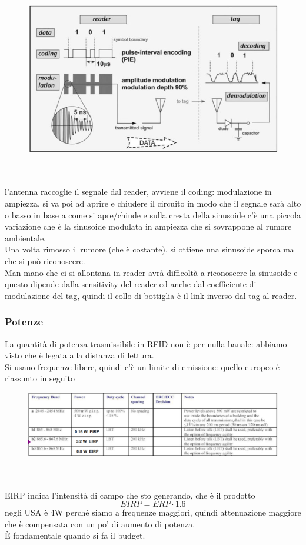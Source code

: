 \documentclass[oneside, 12pt]{extbook}
\begin{document}
\begin{figure}[!h]
	\includegraphics[scale=0.2]{immagini/read-to-tag-mod.png}
\end{figure}\\\\
l'antenna raccoglie il segnale dal reader, avviene il coding: modulazione in ampiezza, si va poi ad aprire e chiudere il circuito in modo che il segnale sarà alto o basso in base a come si apre/chiude e sulla cresta della sinusoide c'è una piccola variazione che è la sinusoide modulata in ampiezza che si sovrappone al rumore ambientale.\\Una volta rimosso il rumore (che è costante), si ottiene una sinusoide sporca ma che si può riconoscere.\\Man mano che ci si allontana in reader avrà difficoltà a riconoscere la sinusoide e questo dipende dalla sensitivity del reader ed anche dal coefficiente di modulazione del tag, quindi il collo di bottiglia è il link inverso dal tag al reader.

\subsubsection{Potenze}
La quantità di potenza trasmissibile in RFID non è per nulla banale: abbiamo visto che è legata alla distanza di lettura.\\Si usano frequenze libere, quindi c'è un limite di emissione: quello europeo è riassunto in seguito\\
\begin{figure}[!h]
	\includegraphics[scale=0.2]{immagini/limiti-tag-em.png}
\end{figure}\\\\
EIRP indica l'intensità di campo che sto generando, che è il prodotto 
\begin{equation}
	EIRP = ERP \cdot 1.6
\end{equation}
negli USA è 4W perché siamo a frequenze maggiori, quindi attenuazione maggiore che è compensata con un po' di aumento di potenza.\\È fondamentale quando si fa il budget.
\end{document}
